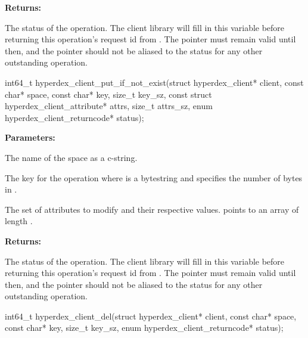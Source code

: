 \noindent\textbf{Returns:}
\begin{description}[labelindent=\widthof{{\code{status}}},leftmargin=*,noitemsep,nolistsep,align=right]
\item[\code{status}] The status of the operation.  The client library will fill in this variable before returning this operation's request id from .  The pointer must remain valid until then, and the pointer should not be aliased to the status for any other outstanding operation.
\end{description}

\funcsep
{}
\begin{ccode}
int64_t hyperdex_client_put_if_not_exist(struct hyperdex_client* client,
                const char* space,
                const char* key, size_t key_sz,
                const struct hyperdex_client_attribute* attrs, size_t attrs_sz,
                enum hyperdex_client_returncode* status);
\end{ccode}
\funcdesc 

\noindent\textbf{Parameters:}
\begin{description}[labelindent=\widthof{{\code{attrs}, \code{attrs\_sz}}},leftmargin=*,noitemsep,nolistsep,align=right]
\item[\code{space}] The name of the space as a c-string.
\item[\code{key}, \code{key\_sz}] The key for the operation where  is a bytestring and  specifies the number of bytes in .
\item[\code{attrs}, \code{attrs\_sz}] The set of attributes to modify and their respective values.   points to an array of length .
\end{description}

\noindent\textbf{Returns:}
\begin{description}[labelindent=\widthof{{\code{status}}},leftmargin=*,noitemsep,nolistsep,align=right]
\item[\code{status}] The status of the operation.  The client library will fill in this variable before returning this operation's request id from .  The pointer must remain valid until then, and the pointer should not be aliased to the status for any other outstanding operation.
\end{description}

\funcsep
{}
\begin{ccode}
int64_t hyperdex_client_del(struct hyperdex_client* client,
                const char* space,
                const char* key, size_t key_sz,
                enum hyperdex_client_returncode* status);
\end{ccode}
\funcdesc 

